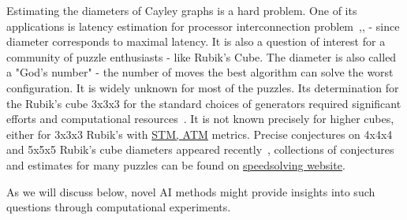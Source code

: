 \documentclass[atmp]{ipart_v1}
\numberwithin{equation}{section}
\theoremstyle{plain}%
\begin{document}
 

Estimating the diameters of Cayley graphs is a hard problem. One of its applications is latency estimation for processor interconnection problem~\cite{akers1989group},\cite{cooperman1991applications}, \cite{heydemann1997cayley} - since diameter corresponds to maximal latency. 
It is also a question of interest for a community of puzzle enthusiasts - like Rubik's Cube. The diameter is also called a "God's number" - the number of moves the best algorithm can solve the worst configuration. It is widely unknown for most of the puzzles. Its determination for the Rubik's cube 3x3x3 for the standard choices of generators required significant efforts and computational resources~\cite{Rokicki2014Diameter}. It is not known precisely for higher cubes, either for 3x3x3 Rubik's with \href{https://www.speedsolving.com/wiki/index.php?title=Metric#STM}{STM, ATM} metrics.%
Precise conjectures on 4x4x4 and 5x5x5 Rubik's cube diameters appeared recently~\cite{hirata2024probabilistic}, collections of conjectures and estimates for many puzzles can be found on \href{https://www.speedsolving.com/wiki/index.php?title=God%27s_Algorithm#Table_of_God.27s_Numbers}{speedsolving website}. 

As we will discuss below, novel AI methods might provide insights into such questions through computational experiments.

\end{document}
